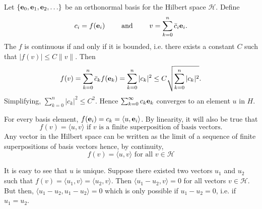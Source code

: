 \documentclass[12pt]{article}
\begin{document}
Let $\lbrace {\bf e}_0, {\bf e}_1, {\bf e}_2, \ldots \rbrace$ be an orthonormal basis for the Hilbert space $\mathcal{H}$.  Define $$c_i = f({\bf e}_i)\qquad \mbox{ and } \qquad v = \sum_{k=0}^n {\bar c}_i {\bf e}_i.$$  The  $f$ is continuous if and only if it is bounded, i.e. there exists a constant $C$ such that $|f(v)| \le C \|v\|$.  Then $$f(v) = \sum_{k=0}^n {\bar c}_k f({\bf e}_k) = \sum_{k=0}^n |c_k|^2 \le C \sqrt{\sum_{k=0}^n |c_k|^2}.$$  Simplifying, $\sum_{k=0}^n |c_k|^2 \le C^2$.  Hence $\sum_{k=0}^\infty c_k {\bf e}_k$ converges to an element $u$ in $H$.

For every basis element, $f({\bf e}_i) = c_k = \langle u, {\bf e}_i \rangle$.  By linearity, it will also be true that $$f(v) = \langle u, v \rangle\mbox{ if $v$ is a finite superposition of basis vectors.}$$  Any vector in the Hilbert space can be written as the limit of a sequence of finite superpositions of basis vectors hence, by continuity, $$f(v) = \langle u, v \rangle\mbox{ for all }v \in \mathcal{H}$$

It is easy to see that $u$ is unique.  Suppose there existed two vectors $u_1$ and $u_2$ such that $f(v) = \langle u_1, v \rangle = \langle u_2, v \rangle$.  Then $\langle u_1 - u_2, v \rangle = 0$ for all vectors $v \in \mathcal{H}$.  But then, $\langle u_1 - u_2, u_1 - u_2 \rangle = 0$ which is only possible if $u_1 - u_2 = 0$, i.e. if $u_1 = u_2$.
\end{document}
